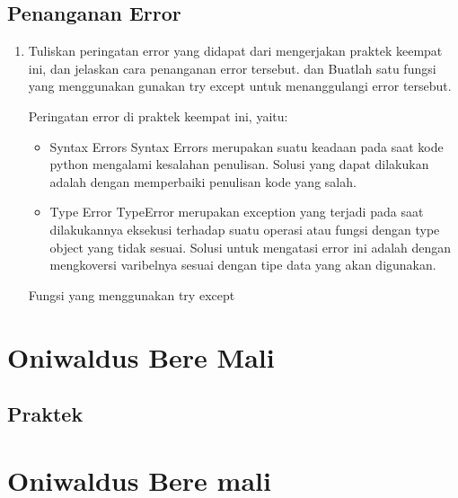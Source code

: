 \subsection{Penanganan Error}
\begin{enumerate}
	\item Tuliskan  peringatan  error  yang  didapat  dari  mengerjakan  praktek  keempat  ini, dan  jelaskan  cara  penanganan  error  tersebut.   dan  Buatlah  satu  fungsi  yang menggunakan gunakan try except untuk menanggulangi error tersebut.
	
	Peringatan error di praktek keempat ini, yaitu:
	\begin{itemize}
		\item Syntax Errors
		Syntax Errors merupakan suatu keadaan pada saat kode python mengalami kesalahan penulisan. Solusi yang dapat dilakukan adalah dengan memperbaiki penulisan kode yang salah.
		
		\item Type Error
		TypeError merupakan exception yang terjadi pada saat dilakukannya eksekusi terhadap suatu operasi atau fungsi dengan type object yang tidak sesuai. Solusi untuk mengatasi error ini adalah dengan mengkoversi varibelnya sesuai dengan tipe data yang akan digunakan.
	\end{itemize}
	
	Fungsi yang menggunakan try except
	
\end{enumerate}

\section{Oniwaldus Bere Mali}
\subsection{Praktek}
\section{Oniwaldus Bere mali}
\








